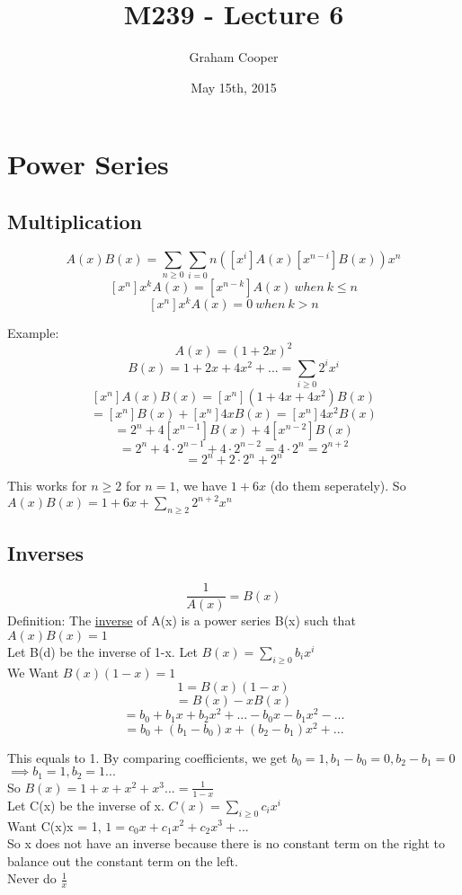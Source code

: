 \documentclass[12pt]{article}
\title{\vspace{-15ex}M239 - Lecture 6\vspace{-1ex}}
\date{May 15th, 2015}
\author{Graham Cooper}
\begin{document}
	\maketitle
	
	\section*{Power Series}
	\subsection*{Multiplication}
	$$A(x)B(x) = \sum_{n \geq 0}\sum_{i=0}{n}([x^i]A(x)[x^{n-i}]B(x))x^n$$
	$$[x^n]x^kA(x)= [x^{n-k}]A(x) \ when \ k \leq n$$
	$$[x^n]x^kA(x)= 0 \ when \ k > n$$
	
	Example: 
	$$A(x)=(1+2x)^2$$
	$$B(x) = 1 + 2x + 4x^2 + ... = \sum_{i \geq 0}2^ix^i$$
	$$[x^n]A(x)B(x) = [x^n](1+4x+4x^2)B(x)$$
	$$= [x^n]B(x) + [x^n]4xB(x) = [x^n]4x^2B(x)$$
	$$= 2^n + 4[x^{n-1}]B(x) + 4[x^{n-2}]B(x)$$
	$$= 2^n + 4 \cdot 2^{n-1} + 4 \cdot 2^{n-2} = 4 \cdot 2^n = 2^{n+2}$$
	$$ = 2^n + 2\cdot 2^n + 2^n$$
	
	This works for $n \geq 2$ for $n = 1$, we have $1 + 6x$ (do them seperately). So $A(x)B(x) = 1+6x + \sum_{n \geq 2}2^{n+2}x^n$\\
	
	\subsection*{Inverses}
	
	$$\frac{1}{A(x)} = B(x)$$
	Definition: The \underline{inverse} of A(x) is a power series B(x) such that $A(x)B(x) = 1$\\
	Let B(d) be the inverse of 1-x. Let $B(x) = \sum_{i \geq 0}b_ix^i$\\
	We Want $B(x)(1-x) = 1$\\
	$$1 = B(x)(1-x)$$
	$$= B(x) - xB(x)$$
	$$= b_0 + b_1x + b_2x^2 + ... - b_0x - b_1x^2 - ...$$
	$$= b_0 + (b_1 - b_0)x + (b_2-b_1)x^2 + ... $$
	
	This equals to 1. By comparing coefficients, we get $b_0 = 1, b_1 - b_0 = 0, b_2-b_1 = 0$\\
	$\implies b_1 = 1, b_2 = 1 ...$\\
	So $B(x) = 1 + x + x^2 + x^3 ... = \frac{1}{1-x}$\\
	
	Let C(x) be the inverse of x. $C(x) = \sum_{i \geq 0}c_ix^i$\\
	Want C(x)x = 1, $1= c_0x + c_1x^2 + c_2x^3 + ...$\\
	So x does not have an inverse because there is no constant term on the right to balance out the constant term on the left.\\
	Never do $\frac{1}{x}$\\
	
\end{document}

